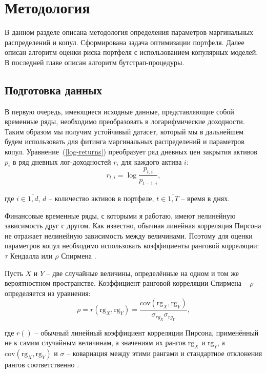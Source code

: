 \newpage

\section{Методология}
\label{section:methodology}

В данном разделе описана методология определения параметров маргинальных распределений и копул. Сформирована задача оптимизации портфеля. Далее описан алгоритм оценки риска портфеля с использованием копулярных моделей. В последней главе описан алгоритм бутстрап-процедуры.

\subsection{Подготовка данных} 
\label{methodology:preparing}

В первую очередь, имеющиеся исходные данные, представляющие собой временные ряды, необходимо преобразовать в логарифмические доходности. 
Таким образом мы получим устойчивый датасет, который мы в дальнейшем будем использовать для фитинга маргинальных распределений и параметров копул. Уравнение~(\ref{log-returns}) преобразует ряд дневных цен закрытия активов $p_i$ в ряд дневных лог-доходностей $r_i$ для каждого актива $i$:
%
\begin{equation}\label{log-returns}
r_{t,i}=\log \frac{p_{t,i}}{p_{t-1,i}},
\end{equation}

\noindent где $i \in \overline{1, d}$, $d$ -- количество активов в портфеле, $t\in \overline{1, T}$ -- время в днях.

Финансовые временные ряды, с которыми я работаю, имеют нелинейную зависимость друг с другом.
Как известно, обычная линейная корреляция Пирсона не отражает нелинейную зависимость между величинами.
Поэтому для оценки параметров копул необходимо использовать коэффициенты ранговой корреляции: $\tau$ Кендалла \cite{Kendall1970} или $\rho$ Спирмена \cite{Mye2003}.

Пусть $X$ и $Y$ -- две случайные величины, определённые на одном и том же вероятностном пространстве. Коэффициент ранговой корреляции Спирмена -- $\rho$ -- определяется из уравнения:
%
\begin{equation}\label{spearman}
\rho = r(\text{rg}_X, \text{rg}_Y) = \frac{\text{cov}(\text{rg}_{X},\text{rg}_{Y})}{\sigma_{rg_X} \sigma_{rg_Y}},
\end{equation}

\noindent где $r()$ -- обычный линейный коэффициент корреляции Пирсона, применённый не к самим случайным величинам, а значениям их рангов $\text{rg}_X$ и $\text{rg}_Y$, а $\text{cov} (\text{rg}_{X}, \text{rg}_{Y})$ и $\sigma$ -- ковариация между этими рангами и стандартное отклонения рангов соответственно \cite{Mye2003}.

